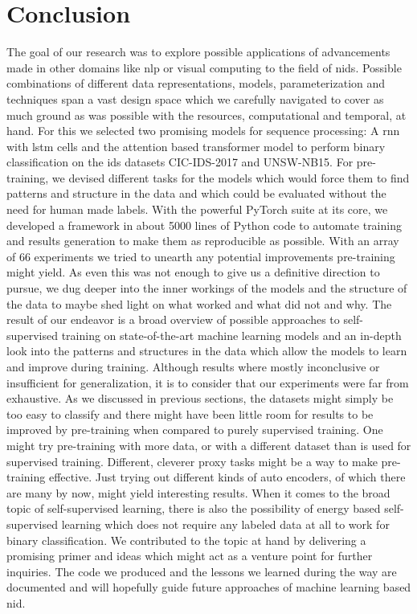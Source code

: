 \chapter{Conclusion} \label{sec:conclusion}

The goal of our research was to explore possible applications of advancements made in other domains like \gls{nlp} or visual computing to the field of \gls{nids}. Possible combinations of different data representations, models, parameterization and techniques span a vast design space which we carefully navigated to cover as much ground as was possible with the resources, computational and temporal, at hand. For this we selected two promising models for sequence processing: A \gls{rnn} with \gls{lstm} cells and the attention based transformer model to perform binary classification on the \gls{ids} datasets CIC-IDS-2017 and UNSW-NB15. For pre-training, we devised different tasks for the models which would force them to find patterns and structure in the data and which could be evaluated without the need for human made labels. With the powerful PyTorch suite at its core, we developed a framework in about 5000 lines of Python code to automate training and results generation to make them as reproducible as possible. With an array of 66 experiments we tried to unearth any potential improvements pre-training might yield. As even this was not enough to give us a definitive direction to pursue, we dug deeper into the inner workings of the models and the structure of the data to maybe shed light on what worked and what did not and why. The result of our endeavor is a broad overview of possible approaches to self-supervised training on state-of-the-art machine learning models and an in-depth look into the patterns and structures in the data which allow the models to learn and improve during training. Although results where mostly inconclusive or insufficient for generalization, it is to consider that our experiments were far from exhaustive. As we discussed in previous sections, the datasets might simply be too easy to classify and there might have been little room for results to be improved by pre-training when compared to purely supervised training. One might try pre-training with more data, or with a different dataset than is used for supervised training. Different, cleverer proxy tasks might be a way to make pre-training effective. Just trying out different kinds of auto encoders, of which there are many by now, might yield interesting results. When it comes to the broad topic of self-supervised learning, there is also the possibility of energy based self-supervised learning which does not require any labeled data at all to work for binary classification. We contributed to the topic at hand by delivering a promising primer and ideas which might act as a venture point for further inquiries. The code we produced and the lessons we learned during the way are documented and will hopefully guide future approaches of machine learning based \gls{nid}. 

\newpage
